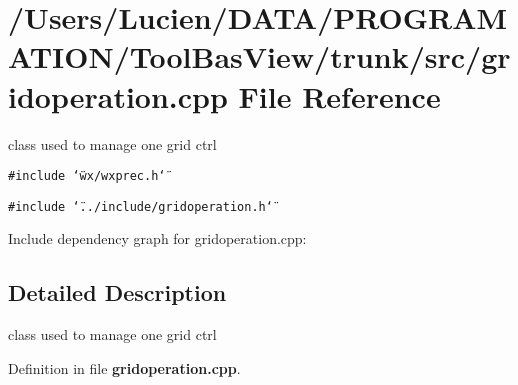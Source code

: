 \section{/Users/Lucien/DATA/PROGRAMATION/Tool\-Bas\-View/trunk/src/gridoperation.cpp File Reference}
\label{gridoperation_8cpp}
class used to manage one grid ctrl 

{\tt \#include \char`\"{}wx/wxprec.h\char`\"{}}\par
{\tt \#include \char`\"{}../include/gridoperation.h\char`\"{}}\par


Include dependency graph for gridoperation.cpp:

\subsection{Detailed Description}
class used to manage one grid ctrl 



Definition in file {\bf gridoperation.cpp}.